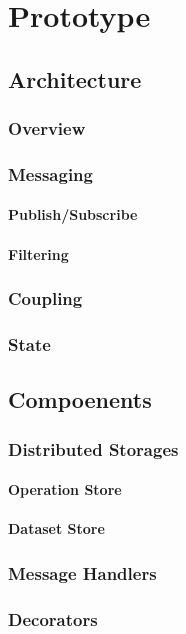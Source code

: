 \chapter{Prototype}
\label{cha:prototype}

\section{Architecture}
\subsection{Overview}
\subsection{Messaging}
\subsubsection{Publish/Subscribe}
\subsubsection{Filtering}
\subsection{Coupling}
\subsection{State}


\section{Compoenents}
\subsection{Distributed Storages}
\subsubsection{Operation Store}
\subsubsection{Dataset Store}
\subsection{Message Handlers}
\subsection{Decorators}
